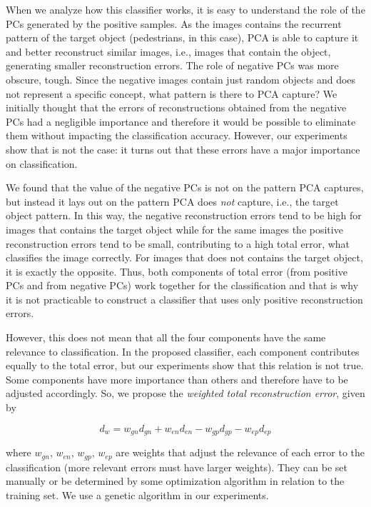 \documentclass[10pt, conference, compsocconf]{IEEEtran}
\begin{document}
When we analyze how this classifier works, it is easy to understand the role of the PCs generated by the positive samples. As the images contains the recurrent pattern of the target object (pedestrians, in this case), PCA is able to capture it and better reconstruct similar images, i.e., images that contain the object, generating smaller reconstruction errors. The role of negative PCs was more obscure, tough. Since the negative images contain just random objects and does not represent a specific concept, what pattern is there to PCA capture? We initially thought that the errors of reconstructions obtained from the negative PCs had a negligible importance and therefore it would be possible to eliminate them without impacting the classification accuracy. However, our experiments show that is not the case: it turns out that these errors have a major importance on classification.

We found that the value of the negative PCs is not on the pattern PCA captures, but instead it lays out on the pattern PCA does \emph{not} capture, i.e., the target object pattern. In this way, the negative reconstruction errors tend to be high for images that contains the target object while for the same images the positive reconstruction errors tend to be small, contributing to a high total error, what classifies the image correctly. For images that does not contains the target object, it is exactly the opposite. Thus, both components of total error (from positive PCs and from negative PCs) work together for the classification and that is why it is not practicable to construct a classifier that uses only positive reconstruction errors.

However, this does not mean that all the four components have the same relevance to classification. In the proposed classifier, each component contributes equally to the total error, but our experiments show that this relation is not true. Some components have more importance than others and therefore have to be adjusted accordingly. So, we propose the \emph{weighted total reconstruction error}, given by

\begin{equation}
  d_w = w_{gn} d_{gn} + w_{en} d_{en} - w_{gp} d_{gp} - w_{ep} d_{ep}
  \label{weighted_total_error}
\end{equation}

\noindent where $w_{gn}$, $w_{en}$, $w_{gp}$, $w_{ep}$ are weights that adjust the relevance of each error to the classification (more relevant errors must have larger weights). They can be set manually or be determined by some optimization algorithm in relation to the training set. We use a genetic algorithm in our experiments.
\end{document}
